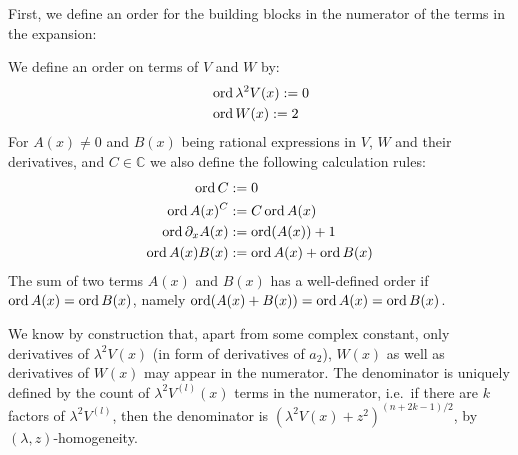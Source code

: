 First, we define an order for the building blocks in the numerator of the
terms in the expansion:
\begin{Definition}
  We define an order on terms of $V$ and $W$ by:
  \begin{align*}
    &\operatorname{ord} \lambda^2 V(x) := 0 \\
    &\operatorname{ord} W(x) := 2
  \end{align*}
  For $A(x)\neq 0$ and $B(x)$ being rational expressions in $V$, $W$ and their
  derivatives, and $C\in\mathbb{C}$ we also define the following calculation
  rules:
  \begin{align*}
    \operatorname{ord} C &:= 0 \\
    \operatorname{ord} A(x)^{C} &:= C\operatorname{ord} A(x) \\
    \operatorname{ord} \partial_x A(x) &:= \operatorname{ord}(A(x)) + 1 \\
    \operatorname{ord} A(x)B(x) &:= \operatorname{ord} A(x) + \operatorname{ord} B(x)
  \end{align*}
  The sum of two terms $A(x)$ and $B(x)$ has a well-defined order if $\operatorname{ord} A(x)
  = \operatorname{ord} B(x)$, namely $\operatorname{ord}(A(x) + B(x)) = \operatorname{ord} A(x) = \operatorname{ord} B(x)$.
\end{Definition}

We know by construction that, apart from some complex constant, only derivatives
of $\lambda^2 V(x)$ (in form of derivatives of $a_2$), $W(x)$ as well as
derivatives of $W(x)$ may appear in the numerator. The denominator is uniquely
defined by the count of $\lambda^2 V^{(l)}(x)$ terms in the numerator, i.e.\ if
there are $k$ factors of $\lambda^2 V^{(l)}$, then the denominator is
$(\lambda^2 V(x) + z^2)^{(n+2k-1)/2}$, by $(\lambda,z)$-homogeneity.

